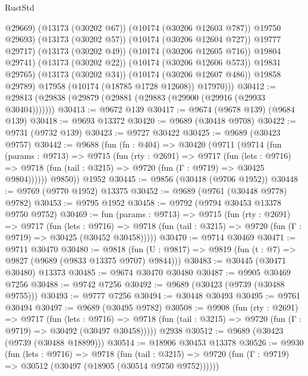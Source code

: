\begin{lexlean}{RustStd}
\begin{coremodule}
                      @29669)
                    (@13173 (@30202 @67))
                    (@10174 (@30206 @12603 @787))
                    @19750
                    @29693)
                  (@13173 (@30202 @57))
                  (@10174 (@30206 @12604 @727))
                  @19777
                  @29717)
                (@13173 (@30202 @49))
                (@10174 (@30206 @12605 @716))
                @19804
                @29741)
              (@13173 (@30202 @22))
              (@10174 (@30206 @12606 @573))
              @19831
              @29765)
            (@13173 (@30202 @34))
            (@10174 (@30206 @12607 @486))
            @19858
            @29789)
          @17958
          (@10174 (@18785 @1728 @12608))
          @17970)))
@30412 := @29813 (@29838 (@29879 (@29881 (@29883 (@29900 (@29916 (@29933 @30404)))))))
@30413 := @9672 @139
@30417 := @9674 (@9678 @139) (@9684 @139)
@30418 := @9693 @13372
@30420 := @9689 (@30418 @9708)
@30422 := @9731 (@9732 @139)
@30423 := @9727 @30422
@30425 := @9689 (@30423 @9757)
@30442 := @9688
    (fun (fn : @404) =>
    @30420
      (@9711
        (@9714
          (fun (params : @9713) =>
          @9715
            (fun (rty : @2691) =>
            @9717
              (fun (lets : @9716) =>
              @9718 (fun (tail : @3215) => @9720 (fun (Γ : @9719) => @30425 @9804))))))
        @9850))
    @1952
@30445 := @9856 (@30418 (@9706 @1952))
@30448 := @9769 (@9770 @1952) @13375
@30452 := @9689 (@9761 (@30448 @9778) @9782)
@30453 := @9795 @1952
@30458 := @9792 (@9794 @30453 @13378 @9750 @9752)
@30469 := fun (params : @9713) =>
  @9715
    (fun (rty : @2691) =>
    @9717
      (fun (lets : @9716) =>
      @9718 (fun (tail : @3215) => @9720 (fun (Γ : @9719) => @30425 (@30452 @30458)))))
@30470 := @9714 @30469
@30471 := @9711 @30470
@30480 := @9818
    (fun (U : @9817) => @9819 (fun (t : @7) => @9827 (@9689 (@9833 @13375 @9707) @9844)))
@30483 := @30445 (@30471 @30480) @13373
@30485 := @9674 @30470 @30480
@30487 := @9905 @30469 @7256
@30488 := @9742 @7256
@30492 := @9689 (@30423 (@9739 (@30488 @9755)))
@30493 := @9777 @7256
@30494 := @30448 @30493
@30495 := @9761 @30494
@30497 := @9689 (@30495 @9782)
@30508 := @9908
    (fun (rty : @2691) =>
    @9717
      (fun (lets : @9716) =>
      @9718 (fun (tail : @3215) => @9720 (fun (Γ : @9719) => @30492 (@30497 @30458)))))
    @2938
@30512 := @9689 (@30423 (@9739 (@30488 @18899)))
@30514 := @18906 @30453 @13378
@30526 := @9930
    (fun (lets : @9716) =>
    @9718
      (fun (tail : @3215) =>
      @9720 (fun (Γ : @9719) => @30512 (@30497 (@18905 (@30514 @9750 @9752))))))

\end{coremodule}
\end{lexlean}
